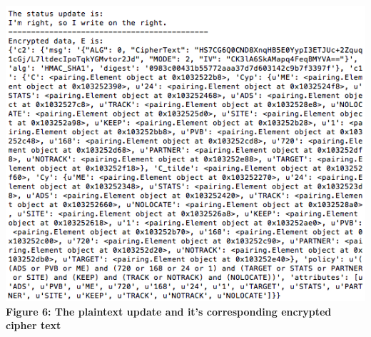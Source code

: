\documentclass[12pt]{article}
\begin{document}
\begin{center}
\includegraphics[scale=.65]{posteddata.png} \\
\textbf{Figure 6: The plaintext update and it's corresponding encrypted cipher text}
\end{center}
\end{document}
